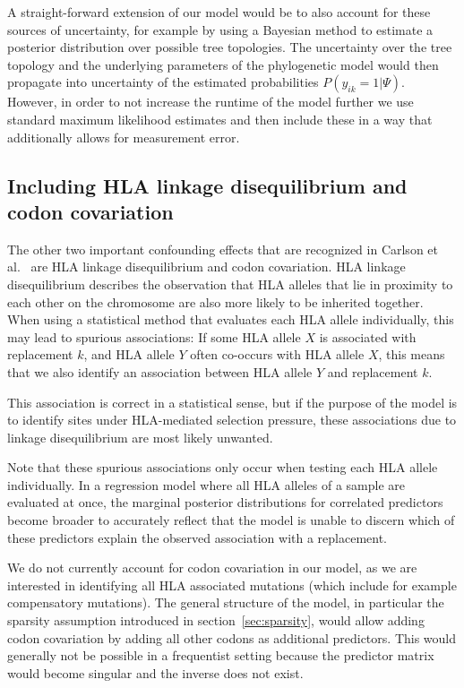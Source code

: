 \documentclass[fleqn,11pt]{SelfArx} %
\begin{document}
A straight-forward extension of our model would be to also account for these sources of uncertainty, for example by using a Bayesian method to estimate a posterior distribution over possible tree topologies. The uncertainty over the tree topology and the underlying parameters of the phylogenetic model would then propagate into uncertainty of the estimated probabilities \(P(y_{ik}=1|\Psi)\). However, in order to not increase the runtime of the model further we  use standard maximum likelihood estimates and then include these in a way that additionally allows for measurement error.

\subsection*{Including HLA linkage disequilibrium and codon covariation}

The other two important confounding effects that are recognized in Carlson et al.~\cite{Carlson2008} are HLA linkage disequilibrium and codon covariation.
HLA linkage disequilibrium describes the observation that HLA alleles that lie in proximity to each other on the chromosome are also more likely to be inherited together. When using a statistical method that evaluates each HLA allele individually, this may lead to spurious associations: If some HLA allele \(X\) is associated with replacement \(k\), and HLA allele \(Y\) often co-occurs with HLA allele \(X\), this means that we also identify an association between HLA allele \(Y\) and replacement \(k\).

This association is correct in a statistical sense, but if the purpose of the model is to identify sites under HLA-mediated selection pressure, these associations due to linkage disequilibrium are most likely unwanted.

Note that these spurious associations only occur when testing each HLA allele individually. In a regression model where all HLA alleles of a sample are evaluated at once, the marginal posterior distributions for correlated predictors become broader to accurately reflect that the model is unable to discern which of these predictors explain the observed association with a replacement.

We do not currently account for codon covariation in our model, as we are interested in identifying all HLA associated mutations (which include for example compensatory mutations). The general structure of the model, in particular the sparsity assumption introduced in section~\ref{sec:sparsity}, would allow adding codon covariation by adding all other codons as additional predictors. This would generally not be possible in a frequentist setting because the predictor matrix would become singular and the inverse does not exist. 
\end{document}
